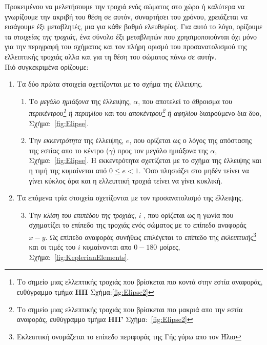 
Προκειμένου να μελετήσουμε την τροχιά ενός σώματος στο χώρο ή καλύτερα να γνωρίζουμε την ακριβή του θέση σε αυτόν, συναρτήσει του χρόνου, χρειάζεται να εισάγουμε έξι μεταβλητές, μια για κάθε βαθμό ελευθερίας. Για αυτό το λόγο, ορίζουμε τα {\it στοιχείας της τροχιάς}, ένα σύνολο έξι μεταβλητών που χρησιμοποιούνται όχι μόνο για την περιγραφή του σχήματος και τον πλήρη ορισμό του προσανατολισμού της ελλειπτικής τροχιάς αλλα και για τη θέση του σώματος πάνω σε αυτήν.\\

Πιό συγκεκριμένα ορίζουμε:

\renewcommand{\labelenumii}{\roman{enumii}}
\begin{enumerate}

 \item Τα δύο πρώτα στοιχεία σχετίζονται με το σχήμα της έλλειψης.
 
  \begin{enumerate}
  \item Το {\it μεγάλο ημιάξονα} της έλλειψης, $\alpha$, που αποτελεί το άθροισμα του {\it περικέντρου\footnote{Το σημείο μιας ελλεπτικής τροχιάς που βρίσκεται πιο κοντά στην εστία αναφοράς, ευθύγραμμο τμήμα {\bf ΗΠ} Σχήμα:\ref{fig:Elipse2}} ή περιηλίου} και του {\it αποκέντρου\footnote{Το σημείο μιας ελλεπτικής τροχιάς που βρίσκεται πιο μακριά απο την εστία αναφοράς, ευθύγραμμο τμήμα {\bf ΗΠ'} Σχήμα:~\ref{fig:Elipse2}} ή αφηλίου} διαιρούμενο δια δύο, Σχήμα:~\ref{fig:Elipse}.
 
 \item Την {\it εκκεντρότητα} της έλλειψης, $e$, που ορίζεται ως ο λόγος της απόστασης της εστίας απο το κέντρο ($\gamma$) προς τον μεγάλο ημιάξονα της $\alpha$, Σχήμα:~\ref{fig:Elipse}. Η εκκεντρότητα σχετίζεται με το σχήμα της έλλειψης και η τιμή της κυμαίνεται από $0 \leq e < 1$. 'Oσο πλησιάζει στο μηδέν τείνει να γίνει κύκλος άρα και η ελλειπτική τροχιά τείνει να γίνει κυκλική.
 \end{enumerate}

 \item Τα επόμενα τρία στοιχεία σχετίζονται με τον προσανατολισμό της έλλειψης.

 \begin{enumerate}
 \setcounter{enumii}{2}
  \item Την {\it κλίση του επιπέδου της τροχιάς}, $i$ , που ορίζεται ως η γωνία που σχηματίζει το επίπεδο της τροχιάς ενός σώματος με το επίπεδο αναφοράς $x-y$. Ως επίπεδο αναφοράς συνήθως επιλέγεται το επίπεδο της {\it εκλειπτικής}\footnote{Εκλειπτική ονομάζεται το επίπεδο περιφοράς της Γής γύρω απο τον Ήλιο} και οι τιμές του $i$ κυμαίνονται απο $0-180$ μοίρες, Σχήμα:~\ref{fig:KeplerianElements}.
  

\end{enumerate}
\end{enumerate}
